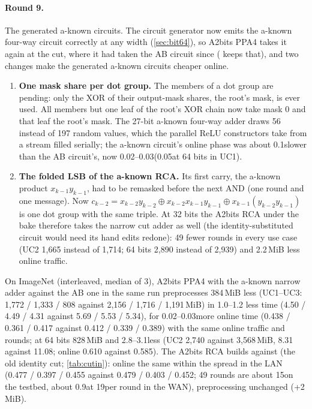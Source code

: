 \paragraph{Round 9.}\label{sec:triadround9} The generated a-known circuits. The circuit generator now emits the
a-known four-way circuit correctly at any width (\cref{sec:bit64}), so A2bits PPA4 takes it again at the cut, where it
had taken the AB circuit since  ( keeps that), and two changes make the
generated a-known circuits cheaper online.
\begin{enumerate}\itemsep1pt
\item \textbf{One mask share per dot group.} The members of a dot group are pending: only the XOR of their output-mask
  shares, the root's mask, is ever used. All members but one leaf of the root's XOR chain now take mask 0 and that leaf
  the root's mask. The 27-bit a-known four-way adder draws 56 instead of 197 random values, which the parallel ReLU
  constructors take from a stream filled serially; the a-known circuit's online phase was about 0.1\s slower than the
  AB circuit's, now 0.02--0.03\s (0.05\s at 64 bits in UC1).
\item \textbf{The folded LSB of the a-known RCA.} Its first carry, the a-known product $x_{k-1} y_{k-1}$, had to be
  remasked before the next AND (one round and one message). Now
  $c_{k-2} = x_{k-2} y_{k-2} \oplus x_{k-2} x_{k-1} y_{k-1} \oplus x_{k-1} (y_{k-2} y_{k-1})$ is one dot group with the
  same triple. At 32 bits the A2bits RCA under the bake therefore takes the narrow cut adder as well (the
  identity-substituted circuit would need its hand edits redone): 49 fewer rounds in every use case (UC2 1{,}665
  instead of 1{,}714; 64 bits 2{,}890 instead of 2{,}939) and 2.2\,MiB less online traffic.
\end{enumerate}
On ImageNet (interleaved, median of 3), A2bits PPA4 with the a-known narrow adder against the AB one in the same run
preprocesses 384\,MiB less (UC1--UC3: 1{,}772 / 1{,}333 / 808 against 2{,}156 / 1{,}716 / 1{,}191\,MiB) in 1.0--1.2\s
less time (4.50 / 4.49 / 4.31 against 5.69 / 5.53 / 5.34\s), for 0.02--0.03\s more online time (0.438 / 0.361 / 0.417
against 0.412 / 0.339 / 0.389\s) with the same online traffic and rounds; at 64 bits 828\,MiB and 2.8--3.1\s less
(UC2 2{,}740 against 3{,}568\,MiB, 8.31 against 11.08\s; online 0.610 against 0.585\s). The A2bits RCA builds against
 (the old identity cut; \cref{tab:cutin}): online the same within the spread in the LAN (0.477 /
0.397 / 0.455 against 0.479 / 0.403 / 0.452\s; 49 rounds are about 15\ms on the testbed, about 0.9\s at 19\ms per round
in the WAN), preprocessing unchanged (+2\,MiB).

